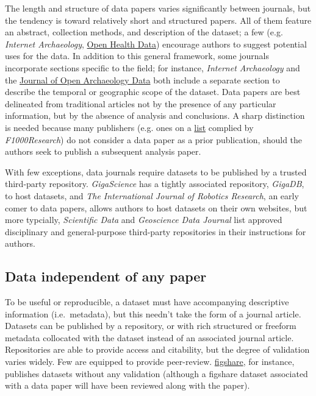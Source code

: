 \documentclass[10pt,a4paper,twocolumn]{article}
\begin{document}
The length and structure of data papers varies significantly between journals, but the tendency is toward relatively short and structured papers.
All of them feature an abstract, collection methods, and description of the dataset; a few (e.g. \emph{Internet Archaeology}, \href{http://openhealthdata.metajnl.com/about/submissions#authorGuidelines}{Open Health Data}) encourage authors to suggest potential uses for the data.
In addition to this general framework, some journals incorporate sections specific to the field; for instance, \emph{Internet Archaeology} and the \href{http://openarchaeologydata.metajnl.com/}{Journal of Open Archaeology Data} both include a separate section to describe the  temporal or geographic scope of the dataset.
Data papers are best delineated from traditional articles not by the presence of any particular information, but by the absence of analysis and conclusions.
A sharp distinction is needed because many publishers (e.g. ones on a \href{https://f1000research.com/data-policies}{list} complied by \emph{F1000Research}) do not consider a data paper as a prior publication, should the authors seek to publish a subsequent analysis paper.

With few exceptions, data journals require datasets to be published by a trusted third-party repository. 
\emph{GigaScience} has a tightly associated repository, \emph{GigaDB}, to host datasets, and \emph{The International Journal of Robotics Research}\cite{international_journal_of_robotics_research}, an early comer to data papers\cite{newman_data_2009}, allows authors to host datasets on their own websites, but more typcially, \emph{Scientific Data} and \emph{Geoscience Data Journal} list approved disciplinary and general-purpose third-party repositories in their instructions for authors.

\subsection*{Data independent of any paper}\label{paper-independent-data}

To be useful or reproducible, a dataset must have accompanying descriptive information (i.e.~metadata), but this needn't take the form of a journal article. 
Datasets can be published by a repository, or with rich structured or freeform metadata collocated with the dataset instead of an associated journal article. Repositories are able to provide access and citability, but the degree of validation varies widely. 
Few are equipped to provide peer-review. \href{http://figshare.com/}{figshare}, for instance, publishes datasets without any validation (although a figshare dataset associated with a data paper will have been reviewed along with the paper). 
\end{document}

